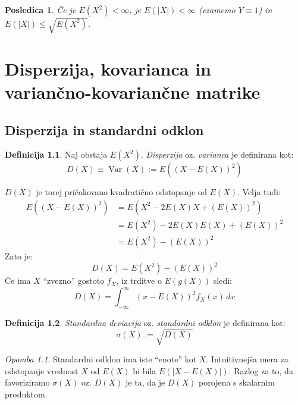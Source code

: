\documentclass[12pt]{book}
\def\n{\noindent}
\theoremstyle{definition}
\newtheorem{definicija}{Definicija}
\theoremstyle{plain}
\theoremstyle{plain}
\theoremstyle{plain}
\theoremstyle{plain}
\newtheorem{posledica}{Posledica}
\theoremstyle{remark}
\newtheorem*{opomba}{Opomba}
\begin{document}
\begin{posledica}
    Če je $E\left(X^2\right)<\infty$, je $E(|X|)<\infty$ (vzamemo $Y \equiv 1$) in $E(|X|) \leq \sqrt{E\left(X^2\right)}$. 
\end{posledica}

\chapter[Disperzija, kovarianca in variančno-kovariančne matrike]{Disperzija, kovarianca in \\ variančno-kovariančne matrike}

\section{Disperzija in standardni odklon}

\begin{definicija}
    Naj obstaja $E\left(X^2\right)$. \emph{Disperzija} oz. \emph{varianca} je definirana kot:
    $$
    D(X) \equiv \operatorname{Var}(X):=E\left((X-E(X))^2\right)
    $$    
\end{definicija}

\n $D(X)$ je torej pričakovano kvadratično odstopanje od $E(X)$. Velja tudi: 
$$
\begin{aligned}
    E\left((X-E(X))^2\right)&=E\left(X^2-2 E(X) X+(E(X))^2\right) \\
    &=E\left(X^2\right)-2 E(X) E(X)+(E(X))^2 \\
    &=E\left(X^2\right)-(E(X))^2
\end{aligned}
$$
Zato je: 
$$
D(X)=E\left(X^2\right)-\left(E(X)\right)^2
$$
Če ima $X$ “zvezno” gostoto $f_X$, iz trditve o $E(g(X))$ sledi: 
$$
D(X)=\int_{-\infty}^{\infty}(x-E(X))^2 f_X(x) \, d x
$$

\begin{definicija}
    \emph{Standardna deviacija} oz. \emph{standardni odklon} je definirana kot: 
    $$
    \sigma(X):=\sqrt{D(X)}
    $$    
\end{definicija}

\begin{opomba}
    Standardni odklon ima iste “enote” kot $X$. Intuitivnejša mera za odstopanje vrednost $X$ od $E(X)$ bi bila $E(|X-E(X)|)$. Razlog za to, da favoriziramo $\sigma(X)$ oz. $D(X)$ je ta, da je $D(X)$ porojena s skalarnim produktom. 
\end{opomba}
\end{document}
